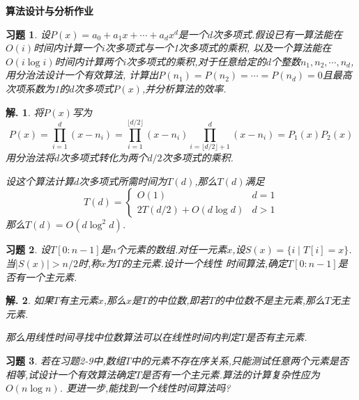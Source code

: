 \documentclass[a4paper,oneside,12pt]{ctexart}
\theoremstyle{plain}
\newtheorem{exercise}{习题}
\theoremstyle{nonumberplain}
\newtheorem{solution}{解.}
\theoremstyle{nonumberplain}
\newcommand{\abs}[1]{\left\vert#1\right\vert}
\begin{document}
    \begin{center}
        \bfseries\LARGE
        算法设计与分析作业
    \end{center}

    \begin{exercise}
        \label{ex:2-7}
        设$P(x)=a_0+a_1x+\cdots+a_dx^d$是一个$d$次多项式.假设已有一算法能在$O(i)$时间内计算一个$i$次多项式与一个1次多项式的乘积,
        以及一个算法能在$O(i\log i)$时间内计算两个$i$次多项式的乘积,对于任意给定的$d$个整数$n_1,n_2,\cdots,n_d$,用分治法设计一个有效算法,
        计算出$P(n_1)=P(n_2)=\cdots=P(n_d)=0$且最高次项系数为1的$d$次多项式$P(x)$,并分析算法的效率.
    \end{exercise}

    \begin{solution}
        将$P(x)$写为 
        \begin{equation*}
            P(x)=\prod_{i=1}^d(x-n_i)=\prod_{i=1}^{\lfloor d/2\rfloor}(x-n_i)\prod_{i=\lfloor d/2\rfloor+1}^d(x-n_i)=P_1(x)P_2(x)
        \end{equation*}
        用分治法将$d$次多项式转化为两个$d/2$次多项式的乘积.

        设这个算法计算$d$次多项式所需时间为$T(d)$,那么$T(d)$满足 
        \begin{equation*}
            T(d)=\begin{cases}
                O(1) & d=1\\
                2T(d/2)+O(d\log d) & d>1
            \end{cases}
        \end{equation*}
        那么$T(d)=O(d\log^2 d)$.
    \end{solution}

    \begin{exercise}
        \label{ex:2-9}
        设$T[0:n-1]$是$n$个元素的数组.对任一元素$x$,设$S(x)=\{i\mid T[i]=x\}$.当$\abs{S(x)}>n/2$时,称$x$为$T$的主元素.设计一个线性
        时间算法,确定$T[0:n-1]$是否有一个主元素.
    \end{exercise}

    \begin{solution}
        如果$T$有主元素$x$,那么$x$是$T$的中位数,即若$T$的中位数不是主元素,那么$T$无主元素.

        那么用线性时间寻找中位数算法可以在线性时间内判定$T$是否有主元素.
    \end{solution}

    \begin{exercise}
        \label{ex:2-10}
        若在习题2-9中,数组$T$中的元素不存在序关系,只能测试任意两个元素是否相等,试设计一个有效算法确定$T$是否有一个主元素.算法的计算复杂性应为$O(n\log n)$.
        更进一步,能找到一个线性时间算法吗?
    \end{exercise}
\end{document}
